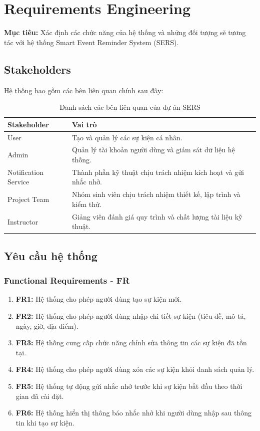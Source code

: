 \section{Requirements Engineering}

\textbf{Mục tiêu:} Xác định các chức năng của hệ thống và những đối tượng sẽ tương tác với hệ thống Smart Event Reminder System (SERS).

\subsection{Stakeholders}
Hệ thống bao gồm các bên liên quan chính sau đây:

\begin{table}[h]
\centering
\renewcommand{\arraystretch}{1.5}
\begin{tabular}{|p{4cm}|p{10cm}|}
\hline
\textbf{Stakeholder} & \textbf{Vai trò} \\ \hline
User & Tạo và quản lý các sự kiện cá nhân. \\ \hline
Admin & Quản lý tài khoản người dùng và giám sát dữ liệu hệ thống. \\ \hline
Notification Service & Thành phần kỹ thuật chịu trách nhiệm kích hoạt và gửi nhắc nhở. \\ \hline
Project Team & Nhóm sinh viên chịu trách nhiệm thiết kế, lập trình và kiểm thử. \\ \hline
Instructor & Giảng viên đánh giá quy trình và chất lượng tài liệu kỹ thuật. \\ \hline
\end{tabular}
\caption{Danh sách các bên liên quan của dự án SERS}
\end{table}

\subsection{Yêu cầu hệ thống}

\subsubsection{Functional Requirements - FR}
\begin{enumerate}
    \item \textbf{FR1:} Hệ thống cho phép người dùng tạo sự kiện mới.
    \item \textbf{FR2:} Hệ thống cho phép người dùng nhập chi tiết sự kiện (tiêu đề, mô tả, ngày, giờ, địa điểm).
    \item \textbf{FR3:} Hệ thống cung cấp chức năng chỉnh sửa thông tin các sự kiện đã tồn tại.
    \item \textbf{FR4:} Hệ thống cho phép người dùng xóa các sự kiện khỏi danh sách quản lý.
    \item \textbf{FR5:} Hệ thống tự động gửi nhắc nhở trước khi sự kiện bắt đầu theo thời gian đã cài đặt.
    \item \textbf{FR6:} Hệ thống hiển thị thông báo nhắc nhở khi người dùng nhập sau thông tin khi tạo sự kiện.
\end{enumerate}

